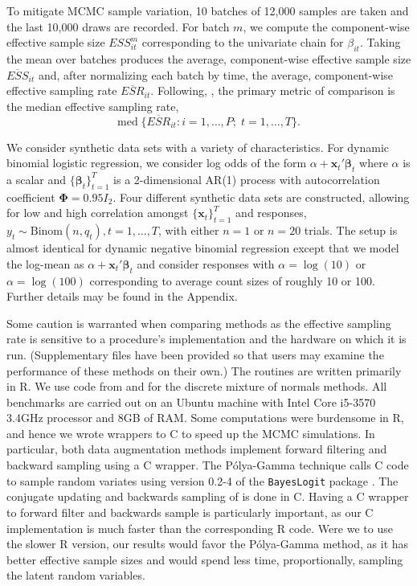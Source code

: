 \documentclass[12pt]{article}
\newcommand{\Polya}{P\'{o}lya}
\newcommand{\bbeta}{\boldsymbol{\beta}}
\newcommand{\vx}{\boldsymbol{x}}
\newcommand{\bPhi}{\boldsymbol{\Phi}}
\begin{document}
To mitigate MCMC sample variation, 10 batches of 12,000 samples are taken and
the last 10,000 draws are recorded.  For batch $m$, we compute the
component-wise effective sample size $ESS_{it}^{m}$ corresponding to the
univariate chain for $\beta_{it}$.  Taking the mean over batches produces the
average, component-wise effective sample size $\overline{ESS}_{it}$ and, after
normalizing each batch by time, the average, component-wise effective sampling
rate $\overline{ESR}_{it}$.  Following,
\cite{fruhwirth-schnatter-fruhwirth-2010}, the primary metric of comparison is
the median effective sampling rate,
\[
\text{med} \; \Big\{ \overline{ESR}_{it} : i=1, \ldots, P; \;  t=1, \ldots, T \Big\}.
\]

We consider synthetic data sets with a variety of characteristics.
For dynamic binomial logistic regression, we consider log odds of the form
$\alpha + \vx_t' \bbeta_t$ where $\alpha$ is a scalar and $\{\bbeta_t\}_{t=1}^T$
is a 2-dimensional AR(1) process with autocorrelation coefficient $\bPhi = 0.95
I_2$.  Four different synthetic data sets are constructed, allowing for low and
high correlation amongst $\{\vx_t\}_{t=1}^T$ and responses, $y_t \sim
\text{Binom}(n, q_t), t=1, \ldots, T$, with either $n=1$ or $n=20$ trials.  The
setup is almost identical for dynamic negative binomial regression except that
we model the log-mean as $\alpha + \vx_t' \bbeta_t$ and consider responses with
$\alpha = \log(10)$ or $\alpha = \log(100)$ corresponding to average count sizes
of roughly 10 or 100.  Further details may be found in the Appendix.

Some caution is warranted when comparing methods as the effective sampling rate
is sensitive to a procedure's implementation and the hardware on which it is
run.  (Supplementary files have been provided so that users may examine the
performance of these methods on their own.)  The routines are written primarily
in R.  We use code from \cite{binomlogit-2012} and
\cite{fruhwirth-schnatter-book-2007} for the discrete mixture of normals
methods.  All benchmarks are carried out on an Ubuntu machine with Intel Core
i5-3570 3.4GHz processor and 8GB of RAM.  Some computations were burdensome in
R, and hence we wrote wrappers to C to speed up the MCMC simulations.  In
particular, both data augmentation methods implement forward filtering and
backward sampling using a C wrapper.  The \Polya-Gamma technique calls C code to
sample random variates using version 0.2-4 of the \texttt{BayesLogit} package
\citep{bayeslogit-2013}.  The conjugate updating and backwards sampling of
\cite{migon-etal-2013} is done in C.  Having a C wrapper to forward filter and
backwards sample is particularly important, as our C implementation is much
faster than the corresponding R code.  Were we to use the slower R version, our
results would favor the \Polya-Gamma method, as it has better effective sample
sizes and would spend less time, proportionally, sampling the latent random
variables.
\end{document}
